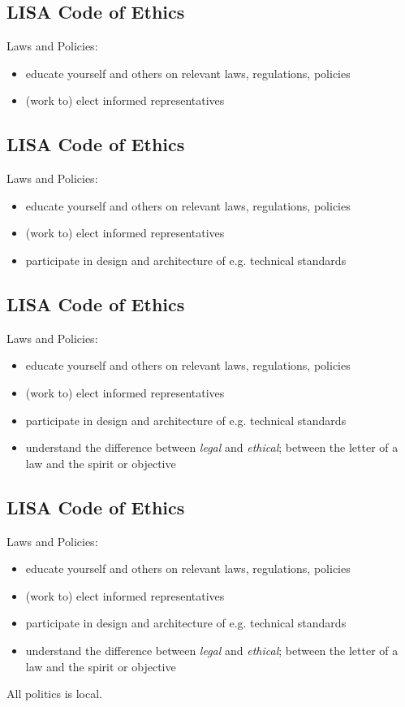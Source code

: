 \documentclass[xga]{xdvislides}
\begin{document}
\subsection{LISA Code of Ethics}
Laws and Policies:
\begin{itemize}
	\item educate yourself and others on relevant laws, regulations, policies
	\item (work to) elect informed representatives
\end{itemize}

\subsection{LISA Code of Ethics}
Laws and Policies:
\begin{itemize}
	\item educate yourself and others on relevant laws, regulations, policies
	\item (work to) elect informed representatives
	\item participate in design and architecture of e.g. technical standards
\end{itemize}

\subsection{LISA Code of Ethics}
Laws and Policies:
\begin{itemize}
	\item educate yourself and others on relevant laws, regulations, policies
	\item (work to) elect informed representatives
	\item participate in design and architecture of e.g. technical standards
	\item understand the difference between {\em
legal} and {\em ethical}; between the letter of a law
and the spirit or objective
\end{itemize}

\subsection{LISA Code of Ethics}
Laws and Policies:
\begin{itemize}
	\item educate yourself and others on relevant laws, regulations, policies
	\item (work to) elect informed representatives
	\item participate in design and architecture of e.g. technical standards
	\item understand the difference between {\em
legal} and {\em ethical}; between the letter of a law
and the spirit or objective
\end{itemize}
\vspace{.5in}
All politics is local.
\end{document}
